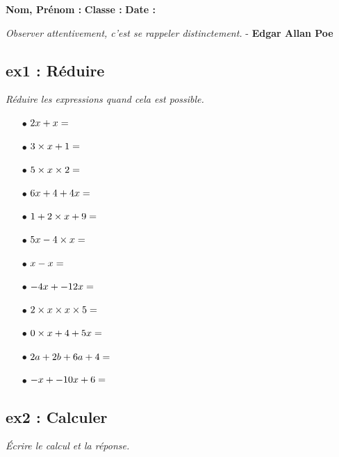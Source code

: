 \documentclass[11pt]{article}
\begin{document}
\textbf{Nom, Prénom :} \hspace{8cm} \textbf{Classe :} \hspace{3cm} \textbf{Date :}\\

\begin{center}
  \textit{Observer attentivement, c'est se rappeler distinctement.}  - \textbf{Edgar Allan Poe}
\end{center}


\subsection*{ex1 : Réduire}

\textit{Réduire les expressions quand cela est possible.}

\begin{multicols}{3}

\begin{itemize}
  \item[$\bullet$] $2x + x = \dotfill$ 
  \item[$\bullet$] $3 \times x + 1 = \dotfill$
  \item[$\bullet$] $5 \times x \times 2 = \dotfill$ 
  \item[$\bullet$] $6x + 4 + 4 x= \dotfill$
  \item[$\bullet$] $1 + 2 \times x + 9 = \dotfill$
  \item[$\bullet$] $5x - 4 \times x = \dotfill$
  \item[$\bullet$] $x - x = \dotfill$
  \item[$\bullet$] $-4x + -12x = \dotfill$
  \item[$\bullet$] $2 \times x \times x \times 5 = \dotfill$
  \item[$\bullet$] $0 \times x + 4 + 5x = \dotfill$
  \item[$\bullet$] $2a + 2b + 6a + 4 = \dotfill$
  \item[$\bullet$] $-x + -10x + 6 = \dotfill$ 
\end{itemize}

\end{multicols}

\subsection*{ex2 : Calculer}

\textit{Écrire le calcul et la réponse.}
\end{document}
